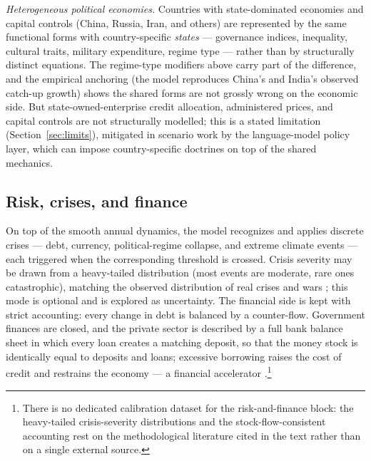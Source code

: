 \documentclass[a4paper,fleqn]{cas-sc}
\newcommand{\response}[1]{\medskip\noindent\textcolor{blue}{\small\itshape [Addressed: #1]}\medskip}
\begin{document}
\emph{Heterogeneous political economies.} Countries with state-dominated economies and capital
controls (China, Russia, Iran, and others) are represented by the same functional forms with
country-specific \emph{states} --- governance indices, inequality, cultural traits, military
expenditure, regime type --- rather than by structurally distinct equations. The regime-type
modifiers above carry part of the difference, and the empirical anchoring (the model reproduces
China's and India's observed catch-up growth) shows the shared forms are not grossly wrong on the
economic side. But state-owned-enterprise credit allocation, administered prices, and capital
controls are not structurally modelled; this is a stated limitation
(Section~\ref{sec:limits}), mitigated in scenario work by the language-model policy layer, which
can impose country-specific doctrines on top of the shared mechanics.

\subsection{Risk, crises, and finance}


On top of the smooth annual dynamics, the model recognizes and applies discrete crises --- debt,
currency, political-regime collapse, and extreme climate events --- each triggered when the
corresponding threshold is crossed. Crisis severity may be drawn from a heavy-tailed distribution
(most events are moderate, rare ones catastrophic), matching the observed distribution of real
crises and wars \citep{taleb2007,weitzman2009}; this mode is optional and is explored as uncertainty.
The financial side is kept with strict accounting: every change in debt is balanced by a
counter-flow. Government finances are closed, and the private sector is described by a full bank
balance sheet in which every loan creates a matching deposit, so that the money stock is identically
equal to deposits and loans; excessive borrowing raises the cost of credit and restrains the economy
--- a financial accelerator \citep{bernanke1999,godley2007}.\footnote{There is no dedicated
calibration dataset for the risk-and-finance block: the heavy-tailed crisis-severity distributions
and the stock-flow-consistent accounting rest on the methodological literature cited in the text
rather than on a single external source.}
\end{document}

